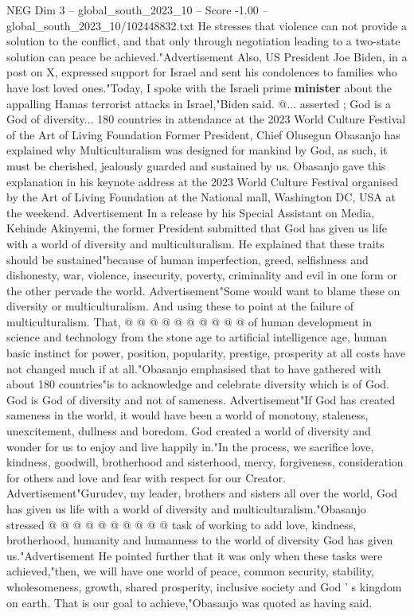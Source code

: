 \begin{textsample}{NEG Dim 3 – global\_south\_2023\_10 – Score -1.00 – global\_south\_2023\_10/102448832.txt}
He stresses that violence can not provide a solution to the conflict, and that only through negotiation leading to a two-state solution can peace be achieved."Advertisement Also, US President Joe Biden, in a post on X, expressed support for Israel and sent his condolences to families who have lost loved ones."Today, I spoke with the Israeli prime \textbf{minister} about the appalling Hamas terrorist attacks in Israel,"Biden said. @... asserted ; God is a God of diversity... 180 countries in attendance at the 2023 World Culture Festival of the Art of Living Foundation Former President, Chief Olusegun Obasanjo has explained why Multiculturalism was designed for mankind by God, as such, it must be cherished, jealously guarded and sustained by us.
Obasanjo gave this explanation in his keynote address at the 2023 World Culture Festival organised by the Art of Living Foundation at the National mall, Washington DC, USA at the weekend.
Advertisement In a release by his Special Assistant on Media, Kehinde Akinyemi, the former President submitted that God has given us life with a world of diversity and multiculturalism.
He explained that these traits should be sustained"because of human imperfection, greed, selfishness and dishonesty, war, violence, insecurity, poverty, criminality and evil in one form or the other pervade the world.
Advertisement"Some would want to blame these on diversity or multiculturalism.
And using these to point at the failure of multiculturalism.
That, @ @ @ @ @ @ @ @ @ @ of human development in science and technology from the stone age to artificial intelligence age, human basic instinct for power, position, popularity, prestige, prosperity at all costs have not changed much if at all."Obasanjo emphasised that to have gathered with about 180 countries"is to acknowledge and celebrate diversity which is of God.
God is God of diversity and not of sameness.
Advertisement"If God has created sameness in the world, it would have been a world of monotony, staleness, unexcitement, dullness and boredom.
God created a world of diversity and wonder for us to enjoy and live happily in."In the process, we sacrifice love, kindness, goodwill, brotherhood and sisterhood, mercy, forgiveness, consideration for others and love and fear with respect for our Creator.
Advertisement"Gurudev, my leader, brothers and sisters all over the world, God has given us life with a world of diversity and multiculturalism."Obasanjo stressed @ @ @ @ @ @ @ @ @ @ task of working to add love, kindness, brotherhood, humanity and humanness to the world of diversity God has given us."Advertisement He pointed further that it was only when these tasks were achieved,"then, we will have one world of peace, common security, stability, wholesomeness, growth, shared prosperity, inclusive society and God ' s kingdom on earth.
That is our goal to achieve,"Obasanjo was quoted as having said.

\end{textsample}
